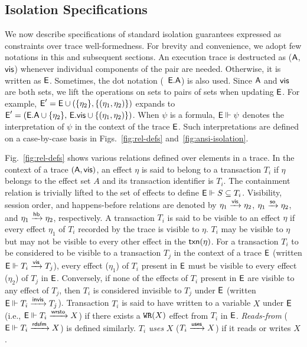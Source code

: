 \subsection{Isolation Specifications}
\label{sec:ansi-isolation}




We now describe specifications of standard isolation guarantees
expressed as constraints over trace well-formedness. For brevity and
convenience, we adopt few notations in this and subsequent sections.
An execution trace is destructed as ($\textsf{A}$,$\textsf{vis}$) whenever individual
components of the pair are needed. Otherwise, it is written as $\textsf{E}$.
Sometimes, the dot notation (\eg~$\textsf{E}.\textsf{A}$) is also used. Since $\textsf{A}$ and
$\textsf{vis}$ are both sets, we lift the operations on sets to pairs of sets
when updating $\textsf{E}$. For example, $\textsf{E}' = \textsf{E} \cup
(\{\eta_2\},\{(\eta_1,\eta_2)\})$ expands to $\textsf{E}' = (\textsf{E}.\textsf{A} \cup
\{\eta_2\},\,\textsf{E}.\textsf{vis} \cup \{(\eta_1,\eta_2)\})$.  When $\psi$ is a
formula, $\textsf{E} \Vdash \psi$ denotes the interpretation of $\psi$ in the
context of the trace $\textsf{E}$. Such interpretations are defined on a
case-by-case basis in Figs.~\ref{fig:rel-defs}
and~\ref{fig:ansi-isolation}. 

Fig.~\ref{fig:rel-defs} shows various relations defined over elements
in a trace. In the context of a trace $(\textsf{A},\textsf{vis})$, an effect $\eta$
is said to belong to a transaction $T_i$ if $\eta$ belongs to the
effect set $A$ and its transaction identifier is $T_i$. The
containment relation is trivially lifted to the set of effects to
define $\textsf{E} \Vdash S \subseteq T_i$.  Visibility, session order, and
happens-before relations are denoted by $\eta_1 \xrightarrow{\textsf{vis}} \eta_2$,
$\eta_1 \xrightarrow{\textsf{so}} \eta_2$, and $\eta_1 \xrightarrow{\textsf{hb}} \eta_2$, respectively. A
transaction $T_i$ is said to be visible to an effect $\eta$ if every
effect $\eta_1$ of $T_i$ recorded by the trace is visible to $\eta$.
$T_i$ may be visible to $\eta$ but may not be visible to every other
effect in the $\textsf{txn}(\eta)$. For a transaction $T_i$ to be considered
to be visible to a transaction $T_j$ in the context of a trace $\textsf{E}$
(written $\textsf{E} \Vdash T_i \xrightarrow{\textsf{vis}} T_j$), every effect ($\eta_1$) of $T_i$
present in $\textsf{E}$ must be visible to every effect ($\eta_2$) of $T_j$ in
$\textsf{E}$.  Conversely, if none of the effects of $T_i$ present in $\textsf{E}$ are
visible to any effect of $T_j$, then $T_i$ is considered invisible to
$T_j$ under $\textsf{E}$ (written $\textsf{E} \Vdash T_i \xrightarrow{\textsf{invis}} T_j$). Transaction
$T_i$ is said to have written to a variable $X$ under $\textsf{E}$ (i.e.,
$\textsf{E} \Vdash T_i \xrightarrow{\textsf{wrsto}} X$) if there exists a ${\tt WR}(X)$ effect from
$T_i$ in $\textsf{E}$.  \emph{Reads-from} ($\textsf{E} \Vdash T_i \xrightarrow{\textsf{rdsfm}} X$) is
defined similarly. $T_i$ \emph{uses} $X$ ($T_i \xrightarrow{\textsf{uses}} X$) if it reads
or writes $X$.

